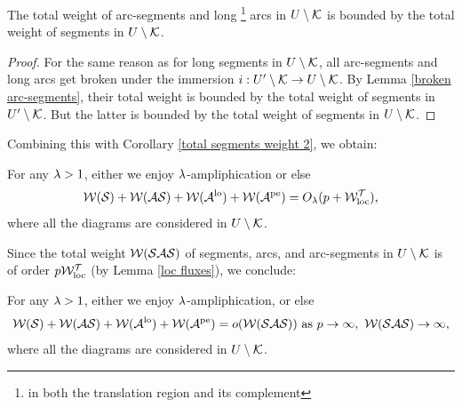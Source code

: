 

\begin{lem}\label{arc-segments and long arcs}
  The total weight of arc-segments and long%
\footnote{in both the translation region and its complement} 
arcs   in  $U\setminus {\mathcal K}$ 
  is  bounded by  the total weight of segments in $U\setminus {\mathcal K}$. 
\end{lem} 

\begin{proof}
For the same reason as for long segments in $U\setminus {\mathcal K}$,
 all arc-segments and long arcs get broken under the immersion 
$i:  U'\setminus {\mathcal K} \rightarrow U\setminus {\mathcal K} $.  By   Lemma \ref{broken arc-segments},
their total weight is bounded by the total weight of segments in 
$U'\setminus {\mathcal K}$. But the latter is bounded by the total weight of segments
in $U\setminus {\mathcal K}$. 
\end{proof}

Combining this with Corollary \ref{total segments weight 2},
we obtain:

\begin{cor}\label{everything} 
  For any ${\lambda}>1$,  either we enjoy ${\lambda}$-ampliphication  or else
  $$ {\mathcal W}({\mathcal S}) + {\mathcal W}({\mathcal{AS}}) + {\mathcal W}({\mathcal A}^{\mathrm{lo}})  + {\mathcal W}({\mathcal A}^{\mathrm{pe}}) = O_{\lambda} (p + {\mathcal W}^{\mathcal T}_{\mathrm{loc}} ), $$
where all the diagrams are considered in $U\setminus {\mathcal K}$.   
\end{cor}  


Since the total weight ${\mathcal W}({\mathcal{SAS}})$ of segments, arcs, and arc-segments in $U\setminus {\mathcal K}$
is of order $p {\mathcal W}_{\mathrm{loc}}^{\mathcal T}$ (by Lemma \ref{loc fluxes}), we conclude: 

\begin{cor}\label{small proportion}
   For any ${\lambda}>1$,  either we enjoy ${\lambda}$-ampliphication,  or else
 \begin{equation}\label{small proportion estimate}
   \WW(\SSS) + \WW(\AS) + \WW(\AAA^\lo) + \WW(\AAA^\pe)    = o (\WW(\SAS) )\
   {\mathrm{as}} \  p\to \infty, \ %
   \WW(\SAS)\to \infty,
\end{equation}    
where all the diagrams are considered in $U\setminus {\mathcal K}$.     
\end{cor}


